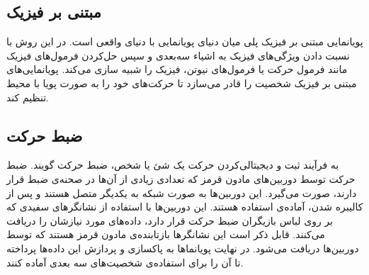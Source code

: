 \subsection{مبتنی بر فیزیک}

پویانمایی مبتنی بر فیزیک پلی میان دنیای پویانمایی با 
دنیای واقعی است. در این روش با نسبت دادن ویژگی‌های فیزیک به اشیاء سه‌بعدی و سپس حل‌کردن
فرمول‌های فیزیک مانند فرمول حرکت یا فرمول‌های نیوتن،
فیزیک را شبیه سازی می‌کند.
پویانمایی‌های مبتنی بر فیزیک شخصیت را قادر می‌سازد تا حرکت‌های خود را 
به صورت پویا با محیط تنظیم کند.

\subsection{ضبط حرکت
\protect {}}

به فرآیند ثبت و دیجیتالی‌کردن حرکت یک شئ یا شخص، ضبط حرکت گویند.
ضبط حرکت توسط دوربین‌های مادون قرمز که تعدادی زیادی از آن‌ها در صحنه‌ی ضبط قرار دارند، صورت می‌گیرد.
این دوربین‌ها به صورت شبکه به یکدیگر متصل هستند و پس از کالیبره شدن، آماده‌ی استفاده هستند.
این دوربین‌ها با استفاده از نشانگر‌های سفیدی که بر روی لباس بازیگران 
ضبط حرکت قرار دارد، داده‌های مورد نیازشان را دریافت می‌کنند.
قابل ذکر است این نشانگر‌ها بازتابنده‌ی مادون قرمز هستند که توسط دوربین‌ها دریافت می‌شود.
در نهایت پویانماها به پاکسازی و پردازش این داده‌ها پرداخته تا آن را 
برای استفاده‌ی شخصیت‌های سه بعدی آماده کنند.


